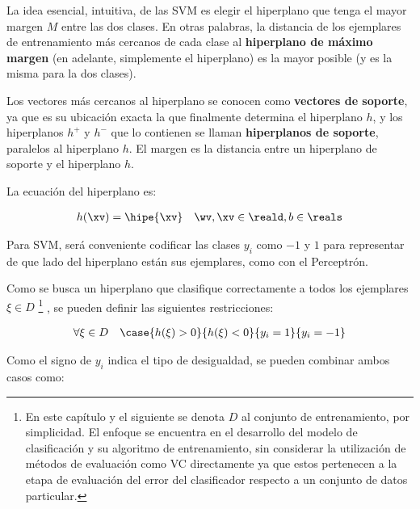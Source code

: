 

La idea esencial, intuitiva, de las SVM es elegir el hiperplano que tenga el mayor margen $M$ entre las dos clases. En otras palabras, la distancia de los ejemplares de entrenamiento más cercanos de cada clase al \textbf{hiperplano de máximo margen} (en adelante, simplemente el hiperplano) es la mayor posible (y es la misma para la dos clases).




Los vectores más cercanos al hiperplano se conocen como \textbf{vectores de soporte}, ya que es su ubicación exacta la que finalmente determina el hiperplano $h$, y los hiperplanos $h^{+}$  y $h^{-}$ que lo contienen se llaman \textbf{hiperplanos de soporte}, paralelos al hiperplano $h$. El margen es la distancia entre un hiperplano de soporte y el hiperplano $h$.

La ecuación del hiperplano es:

\begin{align}
h(\xv) = \hipe{\xv} \quad \wv, \xv \in \reald, b \in \reals
\end{align}

Para SVM, será conveniente codificar las clases $y_i$ como $-1$ y $1$ para representar de que lado del hiperplano están sus ejemplares, como con el Perceptrón.




Como se busca un hiperplano que clasifique correctamente a todos los ejemplares $\xi \in D$ \footnote{En este capítulo y el siguiente se denota $D$ al conjunto de entrenamiento, por simplicidad. El enfoque se encuentra en el desarrollo del modelo de clasificación y su algoritmo de entrenamiento, sin considerar la utilización de métodos de evaluación como VC directamente ya que estos pertenecen a la etapa de evaluación del error del clasificador respecto a un conjunto de datos particular.} , se pueden definir las siguientes restricciones:

\begin{align}
\forall \xi \in D \quad \case{ h(\xi) >0 }{h(\xi) <0}{y_i=1}{y_i=-1} 
\end{align}

Como el signo de $y_i$ indica el tipo de desigualdad, se pueden combinar ambos casos como:


